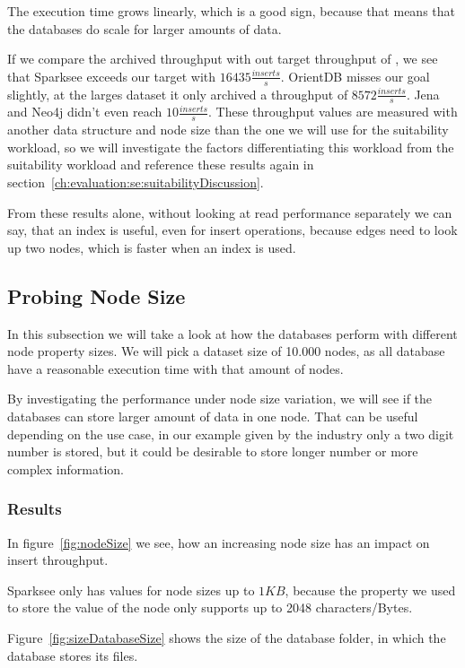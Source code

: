 The execution time grows linearly,
which is a good sign,
because that means that the databases do scale for larger amounts of data.

If we compare the archived throughput with out target throughput of ,
we see that Sparksee exceeds our target with $ 16435 \frac{inserts}{s} $.
OrientDB misses our goal slightly,
at the larges dataset it only archived a throughput of $ 8572 \frac{inserts}{s} $.
Jena and Neo4j didn't even reach $ 10 \frac{inserts}{s} $.
These throughput values are measured with another data structure and node size than the one we will use for the suitability workload,
so we will investigate the factors differentiating this workload from the suitability workload and reference these results again in section~\ref{ch:evaluation:se:suitabilityDiscussion}.

From these results alone,
without looking at read performance separately we can say,
that an index is useful,
even for insert operations,
because edges need to look up two nodes,
which is faster when an index is used.

\subsection{Probing Node Size}
\label{ch:evaluation:se:probingNodeSize}
In this subsection we will take a look at how the databases perform with different node property sizes.
We will pick a dataset size of 10.000 nodes,
as all database have a reasonable execution time with that amount of nodes.

By investigating the performance under node size variation,
we will see if the databases can store larger amount of data in one node.
That can be useful depending on the use case,
in our example given by the industry only a two digit number is stored,
but it could be desirable to store longer number or more complex information.

\subsubsection{Results}
In figure~\ref{fig:nodeSize} we see,
how an increasing node size has an impact on insert throughput.

Sparksee only has values for node sizes up to $ 1KB $,
because the property we used to store the value of the node only supports up to 2048 characters/Bytes.

Figure~\ref{fig:sizeDatabaseSize} shows the size of the database folder,
in which the database stores its files.

